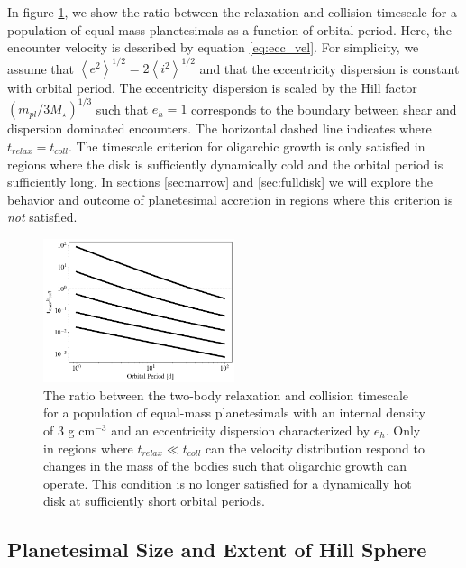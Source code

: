 \documentclass[twocolumn,linenumbers]{aastex63}
\begin{document}
In figure \ref{fig:timescales}, we show the ratio between the relaxation
and collision timescale for a population of equal-mass planetesimals
as a function of orbital period. Here, the encounter velocity is
described by equation \ref{eq:ecc_vel}. For
simplicity, we assume that $\left< e^2 \right>^{1/2} = 2\left< i^2
\right>^{1/2}$ \citep{ida93a} and that the eccentricity dispersion is
constant with orbital period. The eccentricity dispersion is 
scaled by the Hill factor $\left( m_{pl}/ 3 M_{\star}
\right)^{1/3}$ such that $e_{h} = 1$ corresponds to the boundary
between shear and dispersion dominated encounters. The horizontal
dashed line indicates where $t_{relax} = t_{coll}$. The timescale
criterion for oligarchic growth is only satisfied in regions where the
disk is sufficiently dynamically cold and the orbital period is
sufficiently long. In sections \ref{sec:narrow} and \ref{sec:fulldisk}
we will explore the behavior and outcome of planetesimal accretion in regions where this criterion is \textit{not} satisfied. 

\begin{figure}
\begin{center}
    \includegraphics[width=0.5\textwidth]{figures/timescales.png}
    \caption{The ratio between the two-body relaxation and collision
      timescale for a population of equal-mass planetesimals with an
      internal density of 3 g cm$^{-3}$ and an eccentricity dispersion
      characterized by $e_h$. Only in regions where $t_{relax} \ll t_{coll}$ can 
      the velocity distribution respond to changes in the mass of the bodies such
      that oligarchic growth can operate. This condition is no longer satisfied for a dynamically hot disk at sufficiently short orbital periods.\label{fig:timescales}}
\end{center}
\end{figure}

\subsection{Planetesimal Size and Extent of Hill Sphere}\label{sec:sizeandhill}
\end{document}
